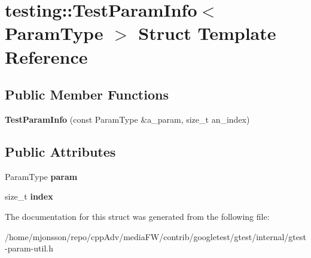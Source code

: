 \hypertarget{structtesting_1_1TestParamInfo}{}\section{testing\+:\+:Test\+Param\+Info$<$ Param\+Type $>$ Struct Template Reference}
\label{structtesting_1_1TestParamInfo}
\subsection*{Public Member Functions}
\begin{DoxyCompactItemize}
\item 
\mbox{\label{structtesting_1_1TestParamInfo_aa54199319bcad5a33c8538ecaecb6de5}} 
{\bfseries Test\+Param\+Info} (const Param\+Type \&a\+\_\+param, size\+\_\+t an\+\_\+index)
\end{DoxyCompactItemize}
\subsection*{Public Attributes}
\begin{DoxyCompactItemize}
\item 
\mbox{\label{structtesting_1_1TestParamInfo_a146d921039f9da8b1336f7cc6e8436c2}} 
Param\+Type {\bfseries param}
\item 
\mbox{\label{structtesting_1_1TestParamInfo_ad4d7bc02cbcc571eb3c1d2ec3ba5bb53}} 
size\+\_\+t {\bfseries index}
\end{DoxyCompactItemize}


The documentation for this struct was generated from the following file\+:\begin{DoxyCompactItemize}
\item 
/home/mjonsson/repo/cpp\+Adv/media\+F\+W/contrib/googletest/gtest/internal/gtest-\/param-\/util.\+h\end{DoxyCompactItemize}
